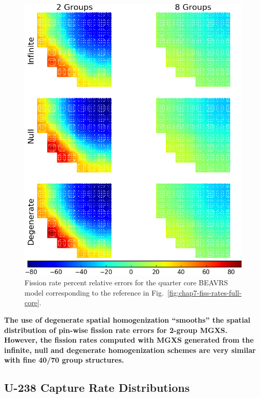 \begin{figure}[h!]
\centering
\includegraphics[width=\linewidth]{figures/quantification/full-core/fiss-err}
\caption[Fission rate errors for the 2D quarter core \ac{BEAVRS} model]{Fission rate percent relative errors for the quarter core \ac{BEAVRS} model corresponding to the reference in Fig.~\ref{fig:chap7-fiss-rates-full-core}.}
\label{fig:chap8-full-core-fiss-err}
\end{figure}

\clearpage

\begin{emphbox}
\textbf{The use of degenerate spatial homogenization ``smooths'' the spatial distribution of pin-wise fission rate errors for 2-group \ac{MGXS}. However, the fission rates computed with \ac{MGXS} generated from the infinite, null and degenerate homogenization schemes are very similar with fine 40/70 group structures.}
\end{emphbox}

\subsection{U-238 Capture Rate Distributions}
\label{subsec:chap8-capt-rates}

